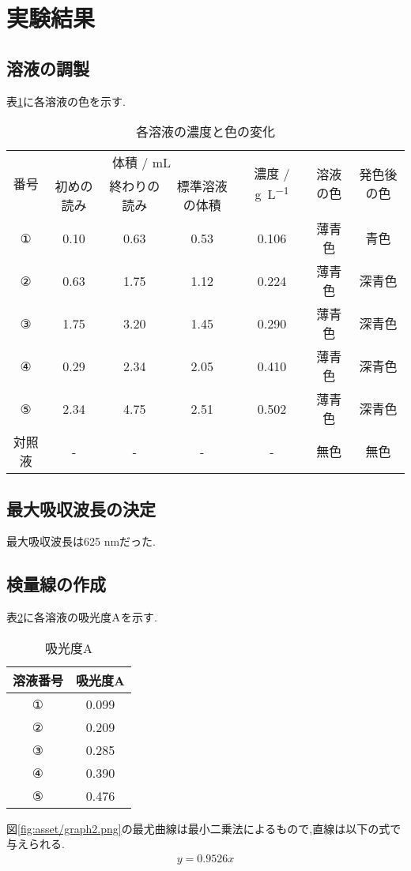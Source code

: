 \section{実験結果}
\subsection{溶液の調製}
表\ref{tab:res_siyaku}に各溶液の色を示す.
\begin{table}[h]
   \caption{各溶液の濃度と色の変化}
   \label{tab:res_siyaku}
   \centering
   \begin{tabular}{ccccccc}
     \hline
     \multirow{2}{*}{番号}&\multicolumn{3}{c}{体積 / \si{\milli L}}&\multirow{2}{*}{濃度 / \si{\gram.L^{-1}}}&\multirow{2}{*}{溶液の色}&\multirow{2}{*}{発色後の色}\\
     &初めの読み&終わりの読み&標準溶液の体積&&&\\
     \hline \hline
     ①&0.10&0.63&0.53&0.106&薄青色&青色\\
     ②&0.63&1.75&1.12&0.224&薄青色&深青色\\
     ③&1.75&3.20&1.45&0.290&薄青色&深青色\\
     ④&0.29&2.34&2.05&0.410&薄青色&深青色\\
     ⑤&2.34&4.75&2.51&0.502&薄青色&深青色\\
     対照液&-&-&-&-&無色&無色\\
     \hline
   \end{tabular}
\end{table}
\subsection{最大吸収波長の決定}
最大吸収波長は625 \si{\nano\meter}だった.
\subsection{検量線の作成}
表\ref{tab:kyuko}に各溶液の吸光度$\rm A$を示す.
\begin{table}[h]
   \caption{吸光度A}
   \label{tab:kyuko}
   \centering
   \begin{tabular}{cc}
     \hline
     溶液番号&吸光度A\\
     \hline \hline
     ①&0.099\\
     ②&0.209\\
     ③&0.285\\
     ④&0.390\\
     ⑤&0.476\\
     \hline
   \end{tabular}
\end{table}
\renewcommand{\thefigure}{\Alph{figure}}
\renewcommand{\thefigure}{\arabic{figure}}
\setcounter{figure}{0}
図\ref{fig:asset/graph2.png}の最尤曲線は最小二乗法によるもので,直線は以下の式で与えられる.
\begin{align}
  \label{equ:saiyu}
  y=0.9526x
\end{align}

